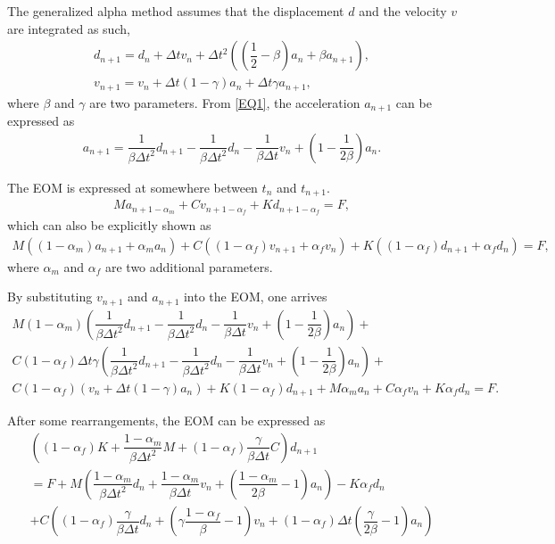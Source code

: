 \documentclass[a4paper,10pt,fleqn]{article}
\begin{document}
The generalized alpha method assumes that the displacement $d$ and the velocity $v$ are integrated as such,
\begin{gather}\label{EQ1}
d_{n+1}=d_n+\Delta{}tv_n+\Delta{}t^2\left(\left(\dfrac{1}{2}-\beta\right)a_n+\beta{}a_{n+1}\right),\\
v_{n+1}=v_n+\Delta{}t\left(1-\gamma\right)a_n+\Delta{}t\gamma{}a_{n+1},
\end{gather}
where $\beta$ and $\gamma$ are two parameters. From \eqref{EQ1}, the acceleration $a_{n+1}$ can be expressed as
\begin{gather}
a_{n+1}=\dfrac{1}{\beta\Delta{}t^2}d_{n+1}-\dfrac{1}{\beta\Delta{}t^2}d_n-\dfrac{1}{\beta\Delta{}t}v_n+\left(1-\dfrac{1}{2\beta}\right)a_n.
\end{gather}

The EOM is expressed at somewhere between $t_n$ and $t_{n+1}$.
\begin{gather}
Ma_{n+1-\alpha_m}+Cv_{n+1-\alpha_f}+Kd_{n+1-\alpha_f}=F,
\end{gather}
which can also be explicitly shown as
\begin{gather}
M\left(\left(1-\alpha_m\right)a_{n+1}+\alpha_ma_n\right)+C\left(\left(1-\alpha_f\right)v_{n+1}+\alpha_fv_n\right)+K\left(\left(1-\alpha_f\right)d_{n+1}+\alpha_fd_n\right)=F,
\end{gather}
where $\alpha_m$ and $\alpha_f$ are two additional parameters.

By substituting $v_{n+1}$ and $a_{n+1}$ into the EOM, one arrives
\begin{multline}
M\left(1-\alpha_m\right)\left(\dfrac{1}{\beta\Delta{}t^2}d_{n+1}-\dfrac{1}{\beta\Delta{}t^2}d_n-\dfrac{1}{\beta\Delta{}t}v_n+\left(1-\dfrac{1}{2\beta}\right)a_n\right)+\\C\left(1-\alpha_f\right)\Delta{}t\gamma{}\left(\dfrac{1}{\beta\Delta{}t^2}d_{n+1}-\dfrac{1}{\beta\Delta{}t^2}d_n-\dfrac{1}{\beta\Delta{}t}v_n+\left(1-\dfrac{1}{2\beta}\right)a_n\right)+\\
C\left(1-\alpha_f\right)\left(v_n+\Delta{}t\left(1-\gamma\right)a_n\right)+K\left(1-\alpha_f\right)d_{n+1}+M\alpha_ma_n+C\alpha_fv_n+K\alpha_fd_n=F.
\end{multline}

After some rearrangements, the EOM can be expressed as
\begin{multline}
\left(\left(1-\alpha_f\right)K+\dfrac{1-\alpha_m}{\beta\Delta{}t^2}M+\left(1-\alpha_f\right)\dfrac{\gamma{}}{\beta\Delta{}t}C\right)d_{n+1}\\
=F+M\left(\dfrac{1-\alpha_m}{\beta\Delta{}t^2}d_n+\dfrac{1-\alpha_m}{\beta\Delta{}t}v_n+\left(\dfrac{1-\alpha_m}{2\beta}-1\right)a_n\right)-K\alpha_fd_n\\
+C\left(\left(1-\alpha_f\right)\dfrac{\gamma{}}{\beta\Delta{}t}d_n+\left(\gamma\dfrac{1-\alpha_f}{\beta}-1\right)v_n+\left(1-\alpha_f\right)\Delta{}t\left(\dfrac{\gamma}{2\beta}-1\right)a_n\right)
\end{multline}
\end{document}
